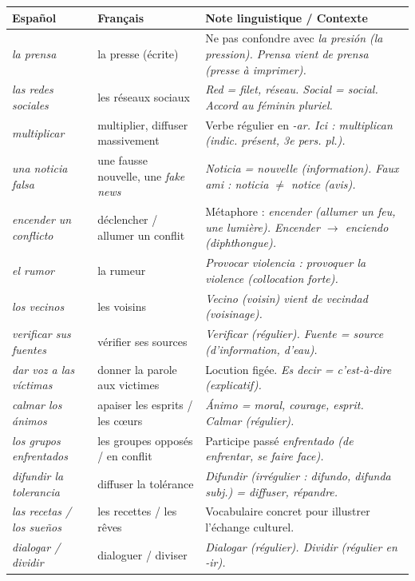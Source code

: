 \documentclass[11pt]{article}
\newcommand{\esp}[1]{\ifmmode\text{\textit{#1}}\else\begingroup\selectlanguage{spanish}\itshape #1\endgroup\fi}
\begin{document}
\begin{center}
\begin{tabularx}{\linewidth}{|X|X|X|}
\hline
\rowcolor{popblueL} \textbf{Español} & \textbf{Français} & \textbf{Note linguistique / Contexte} \\
\hline
\esp{la prensa} & la presse (écrite) & Ne pas confondre avec \esp{la presión} (la pression). \esp{Prensa} vient de \esp{prensa} (presse à imprimer). \\
\hline
\esp{las redes sociales} & les réseaux sociaux & \esp{Red} = filet, réseau. \esp{Social} = social. Accord au féminin pluriel. \\
\hline
\esp{multiplicar} & multiplier, diffuser massivement & Verbe régulier en \esp{-ar}. Ici : \esp{multiplican} (indic. présent, 3e pers. pl.). \\
\hline
\esp{una noticia falsa} & une fausse nouvelle, une \emph{fake news} & \esp{Noticia} = nouvelle (information). Faux ami : \esp{noticia} $\neq$ \emph{notice} (avis). \\
\hline
\esp{encender un conflicto} & déclencher / allumer un conflit & Métaphore : \esp{encender} (allumer un feu, une lumière). \esp{Encender} $\rightarrow$ \esp{enciendo} (diphthongue). \\
\hline
\esp{el rumor} & la rumeur & \esp{Provocar violencia} : provoquer la violence (collocation forte). \\
\hline
\esp{los vecinos} & les voisins & \esp{Vecino} (voisin) vient de \esp{vecindad} (voisinage). \\
\hline
\esp{verificar sus fuentes} & vérifier ses sources & \esp{Verificar} (régulier). \esp{Fuente} = source (d'information, d'eau). \\
\hline
\esp{dar voz a las víctimas} & donner la parole aux victimes & Locution figée. \esp{Es decir} = c'est-à-dire (explicatif). \\
\hline
\esp{calmar los ánimos} & apaiser les esprits / les cœurs & \esp{Ánimo} = moral, courage, esprit. \esp{Calmar} (régulier). \\
\hline
\esp{los grupos enfrentados} & les groupes opposés / en conflit & Participe passé \esp{enfrentado} (de \esp{enfrentar}, se faire face). \\
\hline
\esp{difundir la tolerancia} & diffuser la tolérance & \esp{Difundir} (irrégulier : \esp{difundo}, \esp{difunda} subj.) = diffuser, répandre. \\
\hline
\esp{las recetas / los sueños} & les recettes / les rêves & Vocabulaire concret pour illustrer l'échange culturel. \\
\hline
\esp{dialogar / dividir} & dialoguer / diviser & \esp{Dialogar} (régulier). \esp{Dividir} (régulier en \esp{-ir}). \\
\hline
\end{tabularx}
\end{center}
\end{document}
